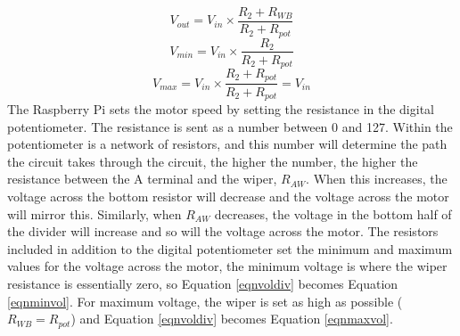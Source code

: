 \documentclass[a4]{report}
\begin{document}
	\begin{equation}
		V_{out} = V_{in}\times \frac{R_2 + R_{WB}}{R_2 + R_{pot}}
		\label{eqnvoldiv}
	\end{equation}\newline
	\begin{equation}
		V_{min} = V_{in}\times \frac{R_2}{R_2 + R_{pot}}
		\label{eqnminvol}
	\end{equation}\newline
	\begin{equation}
		V_{max} = V_{in}\times \frac{R_2 + R_{pot}}{R_2 + R_{pot}} = V_{in}
		\label{eqnmaxvol}
	\end{equation}\newline \noindent
	The Raspberry Pi sets the motor speed by setting the resistance in the digital potentiometer. The resistance is sent as a number between 0 and 127. Within the potentiometer is a network of resistors, and this number will determine the path the circuit takes through the circuit, the higher the number, the higher the resistance between the A terminal and the wiper, \(R_{AW}\). When this increases, the voltage across the bottom resistor will decrease and the voltage across the motor will mirror this. Similarly, when \(R_{AW}\) decreases, the voltage in the bottom half of the divider will increase and so will the voltage across the motor. The resistors included in addition to the digital potentiometer set the minimum and maximum values for the voltage across the motor, the minimum voltage is where the wiper resistance is essentially zero, so Equation \ref{eqnvoldiv} becomes Equation \ref{eqnminvol}. For maximum voltage, the wiper is set as high as possible (\(R_{WB} = R_{pot}\)) and Equation \ref{eqnvoldiv} becomes Equation \ref{eqnmaxvol}. \newline
\end{document}
